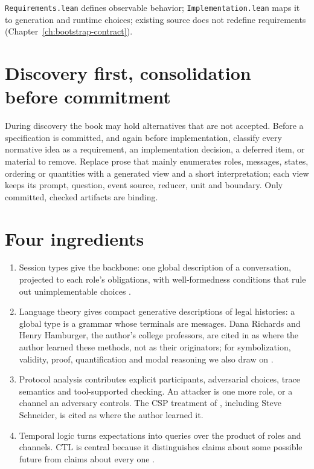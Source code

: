 \texttt{Requirements.lean} defines observable behavior; \texttt{Implementation.lean}
maps it to generation and runtime choices; existing source does not redefine
requirements (Chapter~\ref{ch:bootstrap-contract}).

\section{Discovery first, consolidation before commitment}

During discovery the book may hold alternatives that are not accepted. Before a
specification is committed, and again before implementation, classify every
normative idea as a requirement, an implementation decision, a deferred item, or
material to remove. Replace prose that mainly enumerates roles, messages, states,
ordering or quantities with a generated view and a short interpretation; each
view keeps its prompt, question, event source, reducer, unit and boundary. Only
committed, checked artifacts are binding.

\section{Four ingredients}

\begin{enumerate}[label=\arabic*.]
  \item Session types give the backbone: one global description of a
        conversation, projected to each role's obligations, with well-formedness
        conditions that rule out unimplementable choices
        \citep{honda1998language,honda2008multiparty,yoshida2013scribble}.
  \item Language theory gives compact generative descriptions of legal
        histories: a global type is a grammar whose terminals are messages.
        Dana Richards and Henry Hamburger, the author's college professors, are
        cited in \citet{richards2017logic} as where the author learned these
        methods, not as their originators; for symbolization, validity, proof,
        quantification and modal reasoning we also draw on
        \citet{gensler2017introduction}.
  \item Protocol analysis contributes explicit participants, adversarial
        choices, trace semantics and tool-supported checking. An attacker is one
        more role, or a channel an adversary controls. The CSP treatment of
        \citet{ryan2001modelling}, including Steve Schneider, is cited as where
        the author learned it.
  \item Temporal logic turns expectations into queries over the product of roles
        and channels. CTL is central because it distinguishes claims about some
        possible future from claims about every one \citep{clarke1986automatic}.
\end{enumerate}

